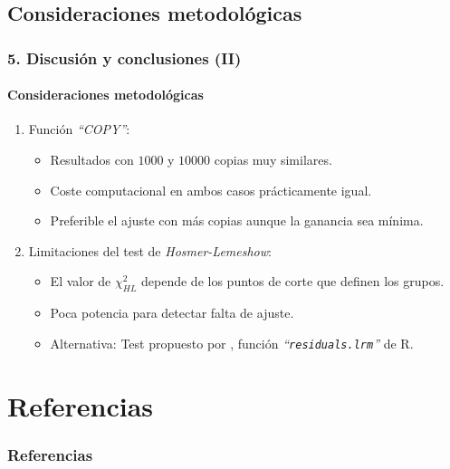 \documentclass{beamer}
\begin{document}
\subsection{Consideraciones metodológicas}
\begin{frame}
\frametitle{5. Discusión y conclusiones (II)}
\framesubtitle{Consideraciones metodológicas}
\begin{enumerate}\itemsep12pt
	\item {\color{green!55!blue} Función \textit{``COPY''}:}
		\begin{itemize}\itemsep6pt
			\item Resultados  con $1000$ y $10000$  copias muy similares.
			\item Coste computacional en ambos casos prácticamente igual.
			\item Preferible el ajuste con más copias aunque la ganancia sea mínima.
		\end{itemize}
	\vspace{0.35cm}
	\item  {\color{green!55!blue} Limitaciones del test de \textit{Hosmer-Lemeshow}:}
		\begin{itemize}\itemsep6pt
			\item El valor de $\chi^2_{HL}$ depende de los puntos de corte que definen los grupos.
			\item Poca potencia para detectar falta de ajuste.
			\item Alternativa:  Test propuesto por  \textcite{bondad}, función  \textit{``\texttt{residuals.lrm}''} de R.
		\end{itemize}
\end{enumerate}
\end{frame}

\section{Referencias}
\begin{frame}
\frametitle{Referencias}
\AtNextBibliography{\small}
\printbibliography[heading=bibintoc, heading=none]
\end{frame}
\end{document}
